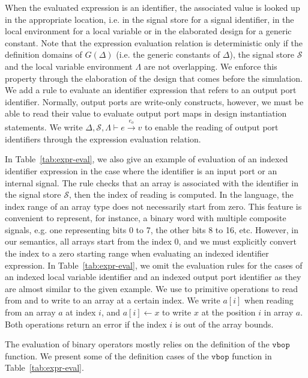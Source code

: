 When the evaluated expression is an identifier, the associated value
is looked up in the appropriate location, i.e. in the signal store for
a signal identifier, in the local environment for a local variable or
in the elaborated design for a generic constant. Note that the
expression evaluation relation is deterministic only if the definition
domains of $G(\Delta)$ (i.e. the generic constants of $\Delta$), the
signal store $\mathcal{S}$ and the local variable environment
$\Lambda$ are not overlapping. We enforce this property through the
elaboration of the design that comes before the simulation. We add a
rule to evaluate an identifier expression that refers to an output
port identifier. Normally, output ports are write-only constructs,
however, we must be able to read their value to evaluate output port
maps in design instantiation statements. We write
$\Delta,\mathcal{S},\Lambda\vdash{}e\xrightarrow{e_o}v$ to enable the
reading of output port identifiers through the expression evaluation
relation.

In Table~\ref{tab:expr-eval}, we also give an example of evaluation of
an indexed identifier expression in the case where the identifier is
an input port or an internal signal. The rule checks that an array is
associated with the identifier in the signal store $\mathcal{S}$, then
the index of reading is computed. In the \hvhdl{} language, the index
range of an array type does not necessarily start from zero. This
feature is convenient to represent, for instance, a binary word with
multiple composite signals, e.g. one representing bits 0 to 7, the
other bits 8 to 16, etc. However, in our semantics, all arrays start
from the index 0, and we must explicitly convert the index to a zero
starting range when evaluating an indexed identifier expression. In
Table~\ref{tab:expr-eval}, we omit the evaluation rules for the cases
of an indexed local variable identifier and an indexed output port
identifier as they are almost similar to the given example. We use to
primitive operations to read from and to write to an array at a
certain index. We write $a[i]$ when reading from an array $a$ at index
$i$, and $a[i]\leftarrow{}x$ to write $x$ at the position $i$ in array
$a$. Both operations return an error if the index $i$ is out of the
array bounds.

The evaluation of binary operators mostly relies on the definition of
the $\mathtt{vbop}$ function. We present some of the definition cases
of the $\mathtt{vbop}$ function in Table~\ref{tab:expr-eval}.

